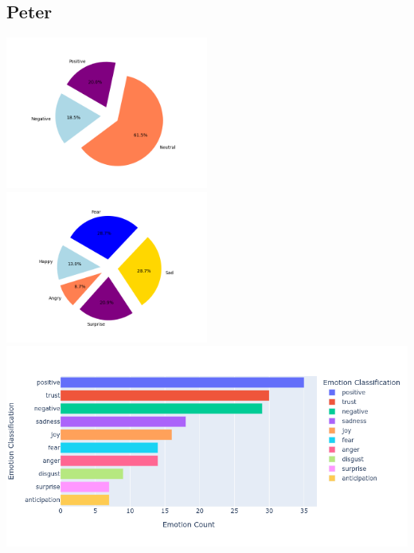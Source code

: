 \documentclass[a4paper,12pt]{article}
\begin{document}
	\subsection{Peter}
	{\includegraphics[height=5cm]{petersVaderEmotionalPie.png}}
	{\includegraphics[height=5cm]{petersEmotionalPie.png}}\\
	{\includegraphics[width=17cm]{peterNrcImage.png}}\\
\end{document}
